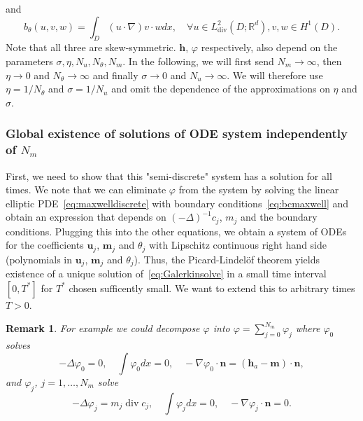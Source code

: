 \documentclass[10pt,letterpaper,twoside]{amsart}
\newtheorem{remark}[lemma]{Remark}
\theoremstyle{definition}{\newtheorem{definition}[lemma]{Definition}}
\theoremstyle{note}{\newtheorem{claim}{Claim}[section]
\newtheorem*{claim*}{Claim}}
\numberwithin{equation}{section}
\newcommand{\dom}{D}
\newcommand{\R}{\mathbb{R}}
\newcommand{\Grad}{\nabla}
\newcommand{\Div}{\operatorname{div}}
\newcommand{\bu}{\mathbf{u}}
\newcommand{\bm}{\mathbf{m}}
\newcommand{\bh}{\mathbf{h}}
\begin{document}
and 
\begin{equation*}
	b_\theta(u,v,w) = \int_{\dom} (u\cdot\Grad ) v \cdot w dx,  \quad \forall u\in L^2_{\text{div}}(\dom;\R^d), v,w\in H^1(\dom).
\end{equation*}
Note that all three are skew-symmetric. $\bh$, $\varphi$ respectively, also depend on the parameters $\sigma, \eta, N_u, N_\theta, N_m$.
In the following, we will first send $N_m\to\infty$, then $\eta\to 0$ and $N_\theta\to \infty$ and finally $\sigma\to 0$ and $N_u\to \infty$. We will therefore use $\eta = 1/N_\theta$ and $\sigma = 1/N_u$ and omit the dependence of the approximations on $\eta$ and $\sigma$.



\subsubsection{Global existence of solutions of ODE system independently of $N_m$}
\label{sec:global-in-time}
First, we need to show that this "semi-discrete" system has a solution for all times. 
We note that we can eliminate $\varphi$ from the system by solving the linear elliptic PDE~\eqref{eq:maxwelldiscrete} with boundary conditions~\eqref{eq:bcmaxwell} and obtain an expression that depends on $(-\Delta)^{-1} c_j$, $m_j$ and the boundary conditions. 
Plugging this into the other equations, we obtain a system of ODEs for the coefficients $\bu_j$, $\bm_j$ and $\theta_j$ with Lipschitz continuous right hand side (polynomials in $\bu_j$, $\bm_j$ and $\theta_j$). Thus, the Picard-Lindel\"of theorem yields existence of a unique solution of~\eqref{eq:Galerkinsolve} in a small time interval $[0,T^*]$ for $T^*$ chosen sufficently small. We want to extend this to arbitrary times $T>0$. 
\begin{remark}
	For example we could decompose $\varphi$ into $\varphi = \sum_{j=0}^{N_m} \varphi_j$ where $\varphi_0$ solves
	\begin{equation*}
		-\Delta \varphi_0 = 0,\quad \int \varphi_0 dx = 0,\quad -\Grad \varphi_0\cdot\mathbf{n} = (\bh_a -\bm)\cdot \mathbf{n} , 
	\end{equation*}
	and $\varphi_j$, $j=1,\dots, N_m$ solve
	\begin{equation*}
		-\Delta \varphi_j = m_j \Div c_j,\quad \int \varphi_j dx =0,\quad -\Grad\varphi_j \cdot \mathbf{n} = 0.
	\end{equation*}
\end{remark}
\end{document}
